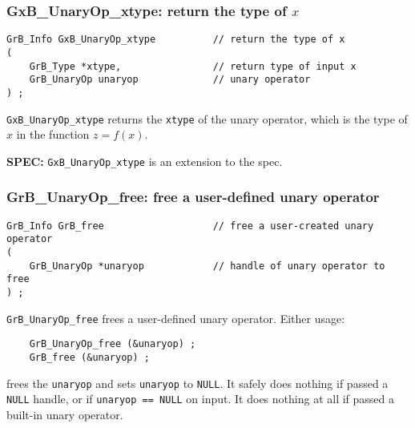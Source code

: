 \documentclass[12pt]{article}
\begin{document}
\subsubsection{{\sf GxB\_UnaryOp\_xtype:} return the type of $x$}
\label{unaryop_xtype}

\begin{mdframed}[userdefinedwidth=6in]
{\footnotesize
\begin{verbatim}
GrB_Info GxB_UnaryOp_xtype          // return the type of x
(
    GrB_Type *xtype,                // return type of input x
    GrB_UnaryOp unaryop             // unary operator
) ;
\end{verbatim}
}\end{mdframed}

\verb'GxB_UnaryOp_xtype' returns the \verb'xtype' of the unary operator, which
is the type of $x$ in the function $z=f(x)$.

\begin{spec}
{\bf SPEC:} \verb'GxB_UnaryOp_xtype' is an extension to the spec.
\end{spec}

\subsubsection{{\sf GrB\_UnaryOp\_free:} free a user-defined unary operator}
\label{unaryop_free}

\begin{mdframed}[userdefinedwidth=6in]
{\footnotesize
\begin{verbatim}
GrB_Info GrB_free                   // free a user-created unary operator
(
    GrB_UnaryOp *unaryop            // handle of unary operator to free
) ;
\end{verbatim}
}\end{mdframed}

\verb'GrB_UnaryOp_free' frees a user-defined unary operator.
Either usage:

    {\small
    \begin{verbatim}
    GrB_UnaryOp_free (&unaryop) ;
    GrB_free (&unaryop) ; \end{verbatim}}

\noindent
frees the \verb'unaryop' and sets \verb'unaryop' to \verb'NULL'.
It safely does nothing if passed a \verb'NULL'
handle, or if \verb'unaryop == NULL' on input.
It does nothing at all if passed a built-in unary operator.
\end{document}
